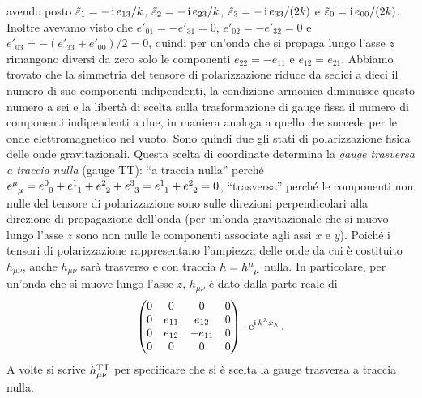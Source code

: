 avendo posto $\tilde{\varepsilon}_{1} = -\operatorname{\mathrm{i}} e_{13}/k$,
$\tilde{\varepsilon}_{2} = -\operatorname{\mathrm{i}} e_{23}/k$,
$\tilde{\varepsilon}_{3} = -\operatorname{\mathrm{i}} e_{33}/(2k)$ e
$\tilde{\varepsilon}_{0} = \operatorname{\mathrm{i}} e_{00}/(2k)$.  Inoltre avevamo visto che
$e'_{01} = -e'_{31} = 0$, $e'_{02} = -e'_{32} = 0$ e
$e'_{03} = -(e'_{33}+e'_{00})/2 = 0$, quindi per un'onda che si propaga lungo
l'asse $z$ rimangono diversi da zero solo le componenti $e_{22} = -e_{11}$ e
$e_{12} = e_{21}$.  Abbiamo trovato che la simmetria del tensore di
polarizzazione riduce da sedici a dieci il numero di sue componenti
indipendenti, la condizione armonica diminuisce questo numero a sei e la libertà
di scelta sulla trasformazione di gauge fissa il numero di componenti
indipendenti a due, in maniera analoga a quello che succede per le onde
elettromagnetico nel vuoto.  Sono quindi due gli stati di polarizzazione fisica
delle onde gravitazionali.  Questa scelta di coordinate determina la
\emph{gauge trasversa a traccia nulla}
(gauge TT): ``a traccia nulla'' perché
$\tensor{e}{^{\mu}_{\mu}} = \tensor{e}{^{0}_{0}} + \tensor{e}{^{1}_{1}} +
\tensor{e}{^{2}_{2}} + \tensor{e}{^{3}_{3}} = \tensor{e}{^{1}_{1}} +
\tensor{e}{^{2}_{2}} = 0$,
``trasversa'' perché le componenti non nulle del tensore di polarizzazione sono
sulle direzioni perpendicolari alla direzione di propagazione dell'onda (per
un'onda gravitazionale che si muovo lungo l'asse $z$ sono non nulle le
componenti associate agli assi $x$ e $y$).  Poiché i tensori di polarizzazione
rappresentano l'ampiezza delle onde da cui è costituito $h_{\mu\nu}$, anche
$h_{\mu\nu}$ sarà trasverso e con traccia $h = \tensor{h}{^{\mu}_{\mu}}$ nulla.
In particolare, per un'onda che si muove lungo l'asse $z$, $h_{\mu\nu}$ è dato
dalla parte reale di
\begin{equation}
  \begin{pmatrix}
    0 & 0      & 0       & 0 \\
    0 & e_{11} & e_{12}  & 0 \\
    0 & e_{12} & -e_{11} & 0 \\
    0 & 0      & 0       & 0
  \end{pmatrix}\cdot \operatorname{\mathrm{e}}^{\operatorname{\mathrm{i}} k^{\lambda}x_{\lambda}}.
\end{equation}
A volte si scrive $h_{\mu\nu}^{\textup{TT}}$ per specificare che si è scelta la
gauge trasversa a traccia nulla.

